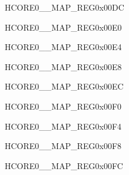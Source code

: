 \begin{register}{H}{CORE0\_\_MAP\_REG}{0x00DC}\label{regdesc:CORE0SYSTIMERTARGET2INTMAPREG}
\end{register}\vspace{-3em}


\begin{register}{H}{CORE0\_\_MAP\_REG}{0x00E0}\label{regdesc:CORE0AHBPDMAINCH0INTMAPREG}
\end{register}\vspace{-3em}


\begin{register}{H}{CORE0\_\_MAP\_REG}{0x00E4}\label{regdesc:CORE0AHBPDMAINCH1INTMAPREG}
\end{register}\vspace{-3em}


\begin{register}{H}{CORE0\_\_MAP\_REG}{0x00E8}\label{regdesc:CORE0AHBPDMAINCH2INTMAPREG}
\end{register}\vspace{-3em}


\begin{register}{H}{CORE0\_\_MAP\_REG}{0x00EC}\label{regdesc:CORE0AHBPDMAOUTCH0INTMAPREG}
\end{register}\vspace{-3em}


\begin{register}{H}{CORE0\_\_MAP\_REG}{0x00F0}\label{regdesc:CORE0AHBPDMAOUTCH1INTMAPREG}
\end{register}\vspace{-3em}


\begin{register}{H}{CORE0\_\_MAP\_REG}{0x00F4}\label{regdesc:CORE0AHBPDMAOUTCH2INTMAPREG}
\end{register}\vspace{-3em}


\begin{register}{H}{CORE0\_\_MAP\_REG}{0x00F8}\label{regdesc:CORE0AXIPDMAINCH0INTMAPREG}
\end{register}\vspace{-3em}


\begin{register}{H}{CORE0\_\_MAP\_REG}{0x00FC}\label{regdesc:CORE0AXIPDMAINCH1INTMAPREG}
\end{register}\vspace{-3em}


